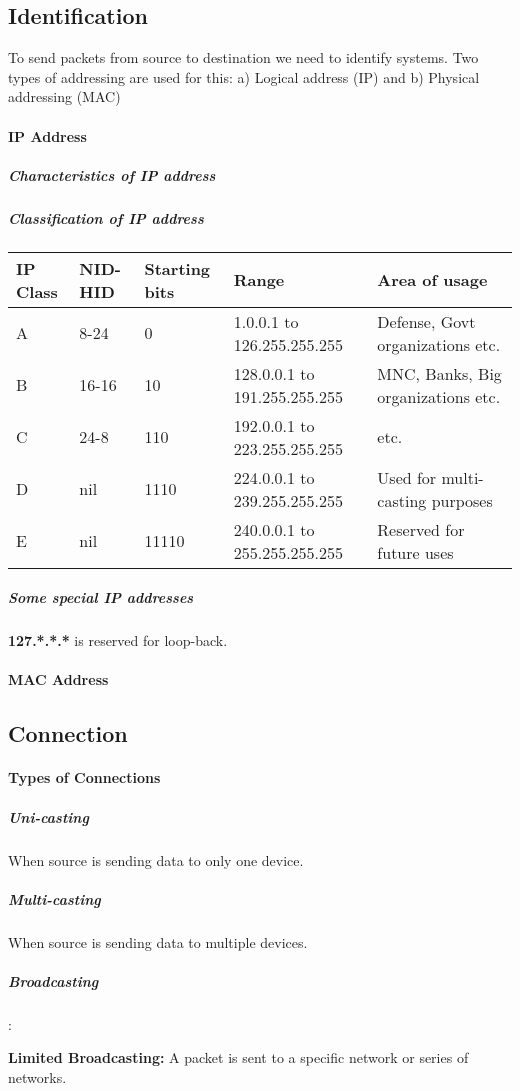 \subsection{Identification}
To send packets from source to destination we need to identify systems. Two types of addressing are used for this: a) Logical address (IP) and b) Physical addressing (MAC)
\paragraph{IP Address}
\subparagraph{Characteristics of IP address}
\subparagraph{Classification of IP address\\}

\begin{tabular}{|p{2em}|p{2em}|p{3em}|p{8em}|p{10em}|}
	\hline IP Class & NID-HID & Starting bits & Range & Area of usage \\
	\hline A & 8-24 & 0 & 1.0.0.1 to 126.255.255.255 & Defense, Govt organizations etc.\\
	\hline B & 16-16 & 10 & 128.0.0.1 to 191.255.255.255 & MNC, Banks, Big organizations etc.\\
	\hline C & 24-8 & 110 & 192.0.0.1 to 223.255.255.255 &  etc.\\
	\hline D & nil & 1110 & 224.0.0.1 to 239.255.255.255 & Used for multi-casting purposes\\
	\hline E & nil & 11110 & 240.0.0.1 to 255.255.255.255 & Reserved for future uses\\
	\hline
\end{tabular}

\subparagraph{Some special IP addresses} 
\textbf{127.*.*.*} is reserved for  loop-back.
\paragraph{MAC Address}
\subsection{Connection}
\paragraph{Types of Connections}
\subparagraph{Uni-casting}
When source is sending data to only one device.
\subparagraph{Multi-casting}
When source is sending data to multiple devices.
\subparagraph{Broadcasting}:

\textbf{Limited Broadcasting:} A packet is sent to a specific network or series of networks.

